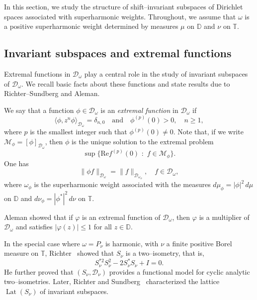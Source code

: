 \documentclass[12pt,reqno,a4paper]{amsart}
\newcommand{\cM}{{\mathcal{M}}}
\renewcommand{\Re}{\mathrm{Re }}
\newcommand\TT{\mathbb{T}}
\newcommand\DD{\mathbb{D}}
\newcommand{\cD}{{\mathcal{D}}}
\numberwithin{equation}{section}
\begin{document}
	In this section, we study the structure of shift--invariant subspaces of Dirichlet spaces associated with superharmonic weights. Throughout, we assume that $\omega$ is a positive superharmonic weight determined by measures $\mu$ on $\DD$ and $\nu$ on $\TT$.
	\subsection{Invariant subspaces and extremal functions}
	Extremal functions in $\mathcal{D}_\omega$ play a central role in the study of invariant subspaces of $\mathcal{D}_\omega$. We recall basic facts about these functions and state results due to Richter--Sundberg and Aleman.
	
	We say that a function $\phi \in \cD_\omega$ is an \textit{extremal function} in \(\cD_\omega\) if 
	$$
	\langle \phi , z^n\phi \rangle_{\cD_\omega} =\delta_{n,0} \quad {\text{and}} \quad \phi^{(p)}(0)>0,\quad n\ge 1,
	$$
	where $p$ is the smallest integer such that $\phi^{(p)}(0) \neq 0$. Note that, if we write $\cM _\phi= [\phi]_{\cD_\omega}$,  then $\phi$ is the unique solution to the extremal problem
	$$
	\sup \{\Re f^{(p)}(0)\,\,: \,\,f \in \cM_\phi\}.
	$$
	One has
	\[
	\|\phi f\|_{\cD_\omega} = \|f\|_{\cD_{\omega_\phi}}, \quad f \in \mathcal{D}_\omega,
	\]
	where $\omega_\phi$ is the superharmonic weight associated with the measures $d\mu_\phi = |\phi|^2\, d\mu$ on $\mathbb{D}$ and $d\nu_\phi = |\phi^*|^2\, d\nu$ on $\mathbb{T}$.
	
	Aleman \cite{Al} showed that if $\varphi$ is an extremal function of $\cD_\omega$, then $\varphi$ is a multiplier of $\cD_\omega$ and satisfies $|\varphi(z)| \le 1$ for all $z \in \DD$.
	
	In the special case where $\omega = P_\nu$ is harmonic, with $\nu$ a finite positive Borel measure on $\mathbb{T}$, Richter~\cite{Ri1} showed that $S_\nu$ is a two--isometry, that is,
	\[
	S_\nu^{*2} S_\nu^2 - 2 S_\nu^* S_\nu + I = 0.
	\]
	He further proved that $(S_\nu, \mathcal{D}_\nu)$ provides a functional model for cyclic analytic two--isometries. Later, Richter and Sundberg~\cite{RS2} characterized the lattice $\operatorname{Lat}(S_\nu)$ of invariant subspaces.
	
\end{document}
